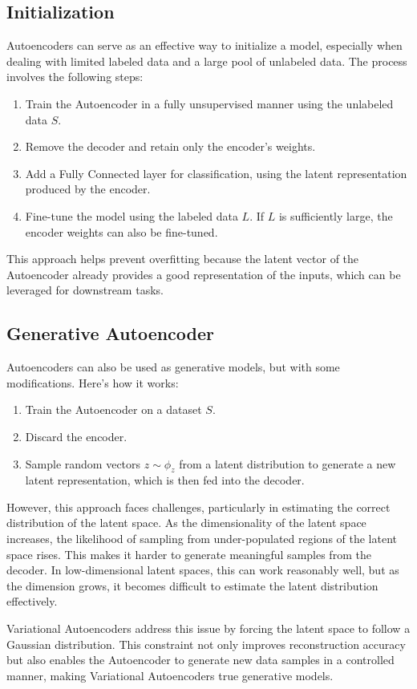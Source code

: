 \subsection{Initialization}
Autoencoders can serve as an effective way to initialize a model, especially when dealing with limited labeled data and a large pool of unlabeled data. 
The process involves the following steps:
\begin{enumerate}
    \item Train the Autoencoder in a fully unsupervised manner using the unlabeled data $S$. 
    \item Remove the decoder and retain only the encoder's weights.
    \item Add a Fully Connected layer for classification, using the latent representation produced by the encoder.
    \item Fine-tune the model using the labeled data $L$.  
        If $L$ is sufficiently large, the encoder weights can also be fine-tuned.
\end{enumerate}
This approach helps prevent overfitting because the latent vector of the Autoencoder already provides a good representation of the inputs, which can be leveraged for downstream tasks.

\subsection{Generative Autoencoder}
Autoencoders can also be used as generative models, but with some modifications.
Here's how it works:
\begin{enumerate}
    \item Train the Autoencoder on a dataset $S$.
    \item Discard the encoder.
    \item Sample random vectors $z\sim\phi_z$ from a latent distribution to generate a new latent representation, which is then fed into the decoder.
\end{enumerate}
However, this approach faces challenges, particularly in estimating the correct distribution of the latent space. 
As the dimensionality of the latent space increases, the likelihood of sampling from under-populated regions of the latent space rises. 
This makes it harder to generate meaningful samples from the decoder. In low-dimensional latent spaces, this can work reasonably well, but as the dimension grows, it becomes difficult to estimate the latent distribution effectively.

Variational Autoencoders address this issue by forcing the latent space to follow a Gaussian distribution.
This constraint not only improves reconstruction accuracy but also enables the Autoencoder to generate new data samples in a controlled manner, making Variational Autoencoders true generative models.